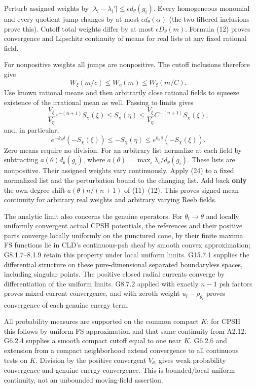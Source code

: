 \documentclass[
  11pt,
]{article}
\begin{document}
Perturb assigned weights by
\(|\lambda_i-\lambda_i'|\leq\epsilon d_\theta(g_i)\). Every homogeneous
monomial and every quotient jump changes by at most
\(\epsilon d_\theta(\alpha)\) (the two filtered inclusions prove this).
Cutoff total weights differ by at most \(\epsilon D_\theta(m)\). Formula
(12) proves convergence and Lipschitz continuity of means for real lists
at any fixed rational field.

For nonpositive weights all jumps are nonpositive. The cutoff inclusions
therefore give \[ W_\xi(m/c)\leq W_\eta(m)\leq W_\xi(m/C).\] Use known
rational means and then arbitrarily close rational fields to squeeze
existence of the irrational mean as well. Passing to limits gives
\[ \frac{V_\xi}{V_\eta}c^{-(n+1)}S_\chi(\xi)\leq S_\chi(\eta)
 \leq\frac{V_\xi}{V_\eta}C^{-(n+1)}S_\chi(\xi),\] and, in particular,
\[ e^{-k_n\delta}(-S_\chi(\xi))\leq-S_\chi(\eta)\leq e^{k_n\delta}(-S_\chi(\xi)). \tag{24}\]
Zero means require no division. For an arbitrary list normalize at each
field by subtracting \(a(\theta)d_\theta(g_i)\), where
\(a(\theta)=\max_i\lambda_i/d_\theta(g_i)\). These lists are
nonpositive. Their assigned weights vary continuously. Apply (24) to a
fixed normalized list and the perturbation bound to the changing list.
Add back \textbf{only} the own-degree shift \(a(\theta)n/(n+1)\) of
(11)--(12). This proves signed-mean continuity for arbitrary real
weights and arbitrary varying Reeb fields.

The analytic limit also concerns the genuine operators. For
\(\theta_l\to\theta\) and locally uniformly convergent actual CPSH
potentials, the references and their positive parts converge locally
uniformly on the punctured cone, by their finite maxima. FS functions
lie in CLD's continuous-psh sheaf by smooth convex approximation;
G8.1.7--8.1.9 retain this property under local uniform limits. G15.7.1
supplies the differential structure on these pure-dimensional separated
boundaryless spaces, including singular points. The positive closed
radial currents converge by differentiation of the uniform limits.
G8.7.2 applied with exactly \(n-1\) psh factors proves mixed-current
convergence, and with zeroth weight \(u_l-\rho_{\theta_l}\) proves
convergence of each genuine energy term.

All probability measures are supported on the common compact \(K\); for
CPSH this follows by uniform FS approximation and that same continuity
from A2.12. G6.2.4 supplies a smooth compact cutoff equal to one near
\(K\). G6.2.6 and extension from a compact neighborhood extend
convergence to all continuous tests on \(K\). Division by the positive
convergent \(V_{\theta_l}\) gives weak probability convergence and
genuine energy convergence. This is bounded/local-uniform continuity,
not an unbounded moving-field assertion.
\end{document}
